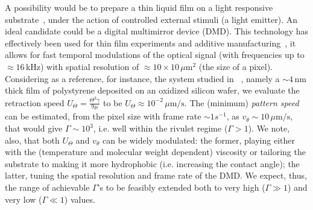 \documentclass[12pt,english]{article}
\begin{document}
\begin{itemize}
{%
A possibility would be to prepare a thin liquid film on a light responsive substrate~\cite{IchimuraEtAl_Science2000}, under the action of controlled 
external stimuli (a light emitter). 
An ideal candidate could be a digital multimirror device (DMD).
This technology has effectively been used for thin film experiments and additive manufacturing~\cite{doi:10.1021/jp301092y, doi:10.1126/science.aax8760}, it allows for fast temporal modulations of the optical signal (with frequencies up to $\approx 16 \, \text{kHz}$)
with spatial resolution of $\approx 10 \times 10 \, \mu \text{m}^2$ (the size of a pixel).
Considering as a reference, for instance, the system studied in ~\cite{becker2003complex,PhysRevLett.99.114503}, namely a $\sim 4 \, \text{nm}$ thick film 
of polystyrene deposited on an oxidized silicon wafer,  
we evaluate the retraction speed 
$U_{\Theta} = \frac{\Theta^3 \gamma}{9 \mu}$ to be 
$U_{\Theta} \approx 10^{-2} \, \mu \text{m}/\text{s}$. 
The (minimum) {\it pattern speed} can be 
estimated, from the pixel size with frame rate $\sim 1 s^{-1}$, as 
$v_{\theta} \sim 10 \, \mu \text{m}/\text{s}$, that would give $\Gamma \sim 10^3$, i.e. well within 
the rivulet regime ($\Gamma > 1$). We note, also, that both $U_{\Theta}$ and $v_{\theta}$ can 
be widely modulated: the former, playing either with the (temperature and molecular weight dependent) viscosity 
or tailoring the substrate to making it more hydrophobic (i.e. increasing the contact angle); the latter, tuning
the spatial resolution and frame rate of the DMD. We expect, thus, the range of achievable $\Gamma$'s to 
be feasibly extended both to very high ($\Gamma \gg 1$) and very low ($\Gamma \ll 1$) values. 
}
\end{itemize}
\end{document}
